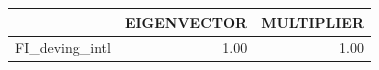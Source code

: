 \begin{tabular}{rrr}
  \hline
 & EIGENVECTOR & MULTIPLIER \\ 
  \hline
FI\_deving\_intl & 1.00 & 1.00 \\ 
   \hline
\end{tabular}
